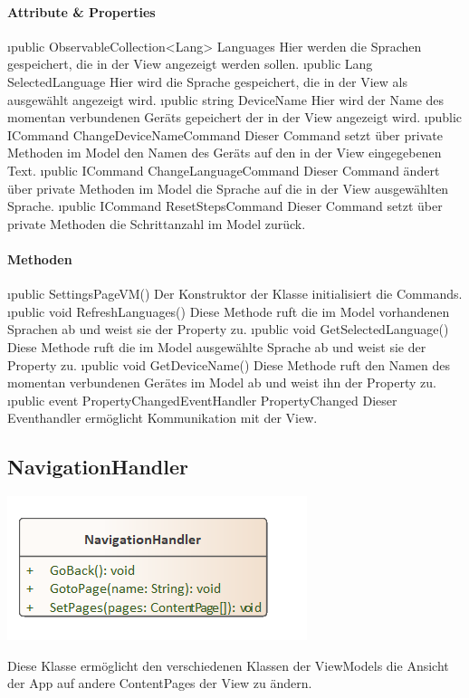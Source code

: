 \documentclass[../entwurf.tex]{subfiles}
\begin{document}
\paragraph{Attribute \& Properties}
\begin{itemize} 
	\i{public ObservableCollection<Lang> Languages} Hier werden die Sprachen gespeichert, die in der View angezeigt werden sollen.
	\i{public Lang SelectedLanguage} Hier wird die Sprache gespeichert, die in der View als ausgewählt angezeigt wird.
	\i{public string DeviceName} Hier wird der Name des momentan verbundenen Geräts gepeichert der in der View angezeigt wird.
	\i{public ICommand ChangeDeviceNameCommand} Dieser Command setzt über private Methoden im Model den Namen des Geräts auf den in der View eingegebenen Text. 
	\i{public ICommand ChangeLanguageCommand} Dieser Command ändert über private Methoden im Model die Sprache auf die in der View ausgewählten Sprache. 
	\i{public ICommand ResetStepsCommand} Dieser Command setzt über private Methoden die Schrittanzahl im Model zurück. 
\end{itemize}
\paragraph{Methoden}
\begin{itemize}
	\i{public SettingsPageVM()} Der Konstruktor der Klasse initialisiert die Commands.
	\i{public void RefreshLanguages()} Diese Methode ruft die im Model vorhandenen Sprachen ab und weist sie der Property  zu.
	\i{public void GetSelectedLanguage()} Diese Methode ruft die im Model ausgewählte Sprache ab und weist sie der Property  zu.
	\i{public void GetDeviceName()} Diese Methode ruft den Namen des momentan verbundenen Gerätes im Model ab und weist ihn der Property  zu.
	\i{public event PropertyChangedEventHandler PropertyChanged} Dieser Eventhandler ermöglicht Kommunikation mit der View.
\end{itemize}
\subsection{NavigationHandler}
\begin{minipage}{0.45\textwidth}
\includegraphics[scale=0.75]{../graphics/vm_klassen/NavigationHandler.png}
\end{minipage}
\begin{minipage}{0.55\textwidth}
Diese Klasse ermöglicht den verschiedenen Klassen der ViewModels die Ansicht der App auf andere ContentPages der View zu ändern.
\end{minipage}
\end{document}
